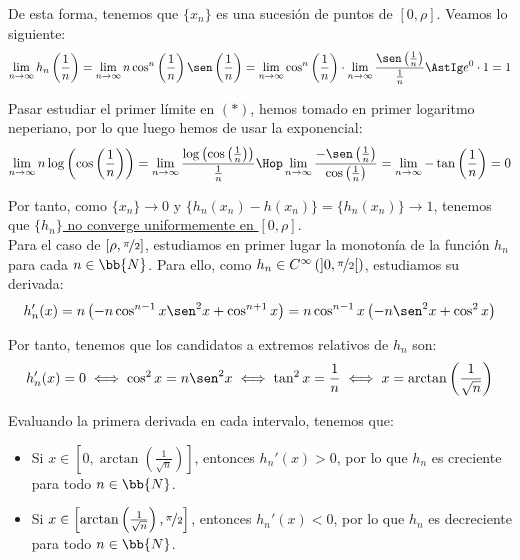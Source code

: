 \begin{ejercicio}
    De esta forma, tenemos que $\{x_n\}$ es una sucesión de puntos de $[0,\rho]$. Veamos lo siguiente:
    \begin{equation*}
        \lim_{n\to \infty}h_n\left(\frac{1}{n}\right) = \lim_{n\to \infty}n\cos^n\left(\frac{1}{n}\right)\sen\left(\frac{1}{n}\right) =
        \lim_{n\to \infty} \cos^n\left(\frac{1}{n}\right)\cdot \lim_{n\to \infty} \frac{\sen\left(\frac{1}{n}\right)}{\frac{1}{n}} \AstIg e^0\cdot 1 = 1
    \end{equation*}

    Pasar estudiar el primer límite en $(\ast)$, hemos tomado en primer logaritmo neperiano, por lo que luego hemos de usar la exponencial:
    \begin{equation*}
        \lim_{n\to \infty} n \log\left(\cos\left(\frac{1}{n}\right)\right) = \lim_{n\to \infty} \frac{\log\left(\cos\left(\frac{1}{n}\right)\right)}{\frac{1}{n}} \Hop
        \lim_{n\to \infty} \frac{-\sen\left(\frac{1}{n}\right)}{\cos\left(\frac{1}{n}\right)}
        = \lim_{n\to \infty} -\tan \left(\frac{1}{n}\right) = 0
    \end{equation*}

    Por tanto, como $\{x_n\}\to 0$ y $\{h_n(x_n)-h(x_n)\}=\{h_n(x_n)\}\to 1$, tenemos que \ul{$\{h_n\}$ no converge uniformemente en $[0,\rho]$}.\\

    Para el caso de $[\rho,\nicefrac{\pi}{2}]$, estudiamos en primer lugar la monotonía de la función $h_n$ para cada $n\in \bb{N}$. Para ello, como $h_n\in C^\infty\left(\left]0,\nicefrac{\pi}{2}\right[\right)$, estudiamos
    su derivada:
    \begin{equation*}
        h_n'(x) = n\left(-n\cos^{n-1}x\sen^2 x + \cos^{n+1} x\right) = n\cos^{n-1}x\left(-n\sen^2 x + \cos^2 x\right)
    \end{equation*}

    Por tanto, tenemos que los candidatos a extremos relativos de $h_n$ son:
    \begin{equation*}
        h_n'(x) = 0 \iff \cos^2 x = n\sen^2 x \iff \tan^2 x = \frac{1}{n}
        \iff x = \arctan\left(\frac{1}{\sqrt{n}}\right)
    \end{equation*}

    Evaluando la primera derivada en cada intervalo, tenemos que:
    \begin{itemize}
        \item Si $x\in \left[0,\arctan\left(\frac{1}{\sqrt{n}}\right)\right]$, entonces $h_n'(x) > 0$, por lo que $h_n$ es creciente para todo $n\in \bb{N}$.
        \item Si $x\in \left[\arctan\left(\frac{1}{\sqrt{n}}\right),\nicefrac{\pi}{2}\right]$, entonces $h_n'(x) < 0$, por lo que $h_n$ es decreciente para todo $n\in \bb{N}$.
    \end{itemize}


\end{ejercicio}

